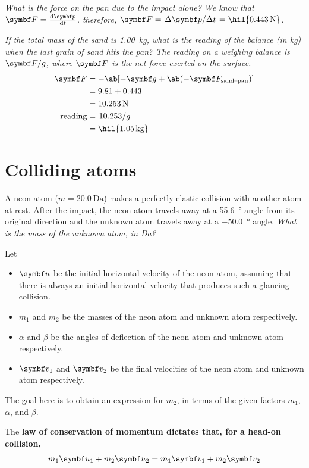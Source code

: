 \it{What is the force on the pan due to the impact alone?}
We know that \(\mv{F} = \odv{\mv{p}}{t}\). therefore, \(\mv{F} =
\lf{\Delta\mv{p}}{\Delta t} = \hil{\qty{0.443}{\newton}}\).

\it{If the total mass of the sand is \qty{1.00}{\kg}, what is the
  reading of the balance (in \unit{\kg}) when the last grain of sand
hits the pan?}
The reading on a weighing balance is \(\mv{F}/g\), where \(\mv{F}\)
is the net force exerted on the surface.
\begin{align*}
  \mv{F} &= -\ab[-\mv{g} + \ab(-\mv{F}_\text{sand--pan})] \\
  &= 9.81 + 0.443 \\
  &= \qty{10.253}{\newton}\\
  \text{reading} &= \lf{10.253}{g} \\
  &= \hil{\qty{1.05}{\kg}}
\end{align*}

\section{Colliding atoms}
A neon atom (\(m = \qty{20.0}{\dalton}\)) makes a perfectly elastic
collision with another atom at rest.
After the impact, the neon atom travels away at a \qty{55.6}{\degree}
angle from its original direction
and the unknown atom travels away at a \qty{-50.0}{\degree} angle.
\it{What is the mass of the unknown atom, in \unit{\dalton}?}

Let
\begin{itemize}
  \item \(\mv{u}\) be the initial horizontal velocity of the neon
    atom, assuming that there is always an initial horizontal
    velocity that produces such a glancing collision.
  \item \(m_1\) and \(m_2\) be the masses of the neon atom and
    unknown atom respectively.
  \item \(\alpha\) and \(\beta\) be the angles of deflection of the
    neon atom and unknown atom respectively.
  \item \(\mv{v}_1\) and \(\mv{v}_2\) be the final velocities of the
    neon atom and unknown atom respectively.
\end{itemize}
The goal here is to obtain an expression for \(m_2\), in terms of the
given factors
\(m_1\), \(\alpha\), and \(\beta\).

The \bf{law of conservation of momentum} dictates that, for a head-on collision,
\begin{equation}
  m_1\mv{u}_1 + m_2\mv{u}_2 = m_1\mv{v}_1 + m_2\mv{v}_2
\end{equation}

